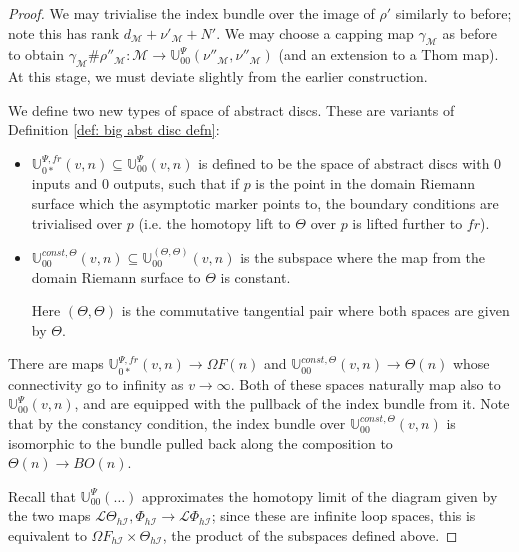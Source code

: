 \documentclass{TPmod}
\def\bU{\mathbb{U}}
\newcommand{\cI}{\mathcal{I}}
\newcommand{\cL}{\mathcal{L}}
\newcommand{\cM}{\mathcal{M}}
\numberwithin{equation}{section}
\begin{document}
\begin{proof}
        We may trivialise the index bundle over the image of $\rho'$ similarly to before; note this has rank $d_\cM+\nu'_\cM+N'$. We may choose a capping map $\gamma_\cM$ as before to obtain $\gamma_\cM \# \rho''_\cM: \cM \to \bU^\Psi_{00}(\nu''_\cM, \nu''_\cM)$ (and an extension to a Thom map). At this stage, we must deviate slightly from the earlier construction.

        We define two new types of space of abstract discs. These are variants of Definition \ref{def: big abst disc defn}: 
        
     
       
        \begin{itemize}
            \item $\bU^{\Psi,fr}_{0*}(v, n) \subseteq \bU^\Psi_{00}(v, n)$ is defined to be the space of abstract discs with 0 inputs and 0 outputs, such that if $p$ is the point in the domain Riemann surface which the asymptotic marker points to, the boundary conditions are trivialised over $p$ (i.e. the homotopy lift to $\Theta$ over $p$ is lifted further to $fr$).    
            \item $\bU^{const,\Theta}_{00}(v, n) \subseteq \bU^{(\Theta,\Theta)}_{00}(v, n)$ is the subspace where the map from the domain Riemann surface to $\Theta$ is constant.

            Here $(\Theta, \Theta)$ is the commutative tangential pair where both spaces are given by $\Theta$.
        \end{itemize}
        There are maps $\bU^{\Psi, fr}_{0*}(v,n) \to \Omega F(n)$ and $\bU^{const,\Theta}_{00}(v,n) \to \Theta(n)$ whose connectivity go to infinity as $v \to \infty$. Both of these spaces naturally map also to $\bU^\Psi_{00}(v, n)$, and are equipped with the pullback of the index bundle from it. Note that by the constancy condition, the index bundle over $\bU^{const,\Theta}_{00}(v, n)$ is isomorphic to the bundle pulled back along the composition to $\Theta(n) \to BO(n)$.
        
        Recall that $\bU^\Psi_{00}(\ldots)$ approximates the homotopy limit of the diagram given by the two maps $\cL \Theta_{h\cI}, \Phi_{h\cI} \to \cL \Phi_{h\cI}$; since these are infinite loop spaces, this is equivalent to $\Omega F_{h\cI} \times \Theta_{h\cI}$, the product of the subspaces defined above.


\end{proof}
\end{document}
